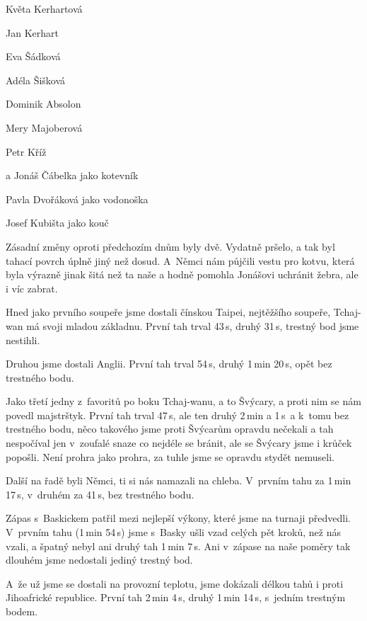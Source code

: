 \documentclass[11pt]{article}
\begin{document}
\vspace*{6pt}
Květa Kerhartová

Jan Kerhart

Eva Šádková

Adéla Šišková

Dominik Absolon

Mery Majoberová

Petr Kříž

a Jonáš Čábelka jako kotevník

\vspace*{6pt}

Pavla Dvořáková jako vodonoška

Josef Kubišta jako kouč

\vspace*{6pt}

Zásadní změny oproti předchozím dnům byly dvě. Vydatně pršelo, a tak byl tahací povrch úplně jiný než dosud. A~Němci nám půjčili vestu pro kotvu, která byla výrazně jinak šitá než ta naše a hodně pomohla Jonášovi uchránit žebra, ale i víc zabrat.

Hned jako prvního soupeře jsme dostali čínskou Taipei, nejtěžšího soupeře, Tchaj-wan má svoji mladou základnu. První tah trval 43\,s, druhý 31\,s, trestný bod jsme nestihli.

Druhou jsme dostali Anglii. První tah trval 54\,s, druhý 1\,min 20\,s, opět bez trestného bodu.

Jako třetí jedny z~favoritů po boku Tchaj-wanu, a to Švýcary, a proti nim se nám povedl majstrštyk. První tah trval 47\,s, ale ten druhý 2\,min a 1\,s~a k~tomu bez trestného bodu, něco takového jsme proti Švýcarům opravdu nečekali a tah nespočíval jen v~zoufalé snaze co nejdéle se bránit, ale se Švýcary jsme i krůček popošli. Není prohra jako prohra, za tuhle jsme se opravdu stydět nemuseli.

Další na řadě byli Němci, ti si nás namazali na chleba. V~prvním tahu za 1\,min 17\,s, v~druhém za 41\,s, bez trestného bodu.

Zápas s~Baskickem patřil mezi nejlepší výkony, které jsme na turnaji předvedli. V~prvním tahu (1\,min 54\,s) jsme s~Basky ušli vzad celých pět kroků, než nás vzali, a špatný nebyl ani druhý tah 1\,min 7\,s. Ani v~zápase na naše poměry tak dlouhém jsme nedostali jediný trestný bod.

A~že už jsme se dostali na provozní teplotu, jsme dokázali délkou tahů i proti Jihoafrické republice. První tah 2\,min 4\,s, druhý 1\,min 14\,s, s~jedním trestným bodem.
\end{document}

